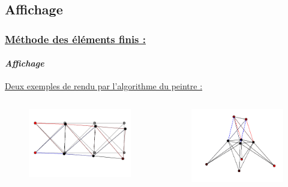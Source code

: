 \documentclass[10pt]{beamer}
\begin{document}
	\subsection{Affichage}
	\begin{frame}
		\frametitle{\uline{M\'ethode des \'el\'ements finis :}}
		\framesubtitle{\textit{Affichage}}
		\uline{Deux exemples de rendu par l'algorithme du peintre :}
		\begin{columns}[t]
			\begin{column}{5cm}
				\begin{figure}
 				 	\includegraphics[scale=0.25]{Images/2D_exemple.png}
 				\end{figure}
  			\end{column}
 			\begin{column}{5cm}
 				\begin{figure}
 				 	\includegraphics[scale=0.25]{Images/3D_exemple.png}
 				\end{figure}
			\end{column}
 		\end{columns}
	\end{frame} 
\end{document}
